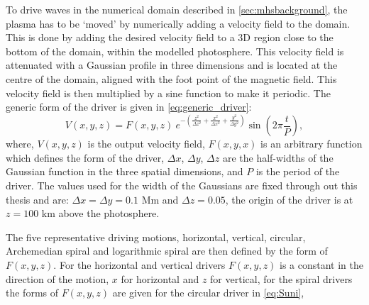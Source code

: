 \documentclass[a4paper,12pt,fourier,authoryear,custommargin]{Classes/PhDThesisPSnPDF}
\begin{document}
To drive waves in the numerical domain described in \cref{sec:mhsbackground}, the plasma has to be `moved' by numerically adding a velocity field to the domain.
This is done by adding the desired velocity field to a 3D region close to the bottom of the domain, within the modelled photosphere.
This velocity field is attenuated with a Gaussian profile in three dimensions and is located at the centre of the domain, aligned with the foot point of the magnetic field.
This velocity field is then multiplied by a sine function to make it periodic. The generic form of the driver is given in \cref{eq:generic_driver}:
\begin{equation}
	V(x,y,z) = F(x,y,z) \ e^{-\left(\frac{z^2}{\Delta z^2} + \frac{x^2}{\Delta x^2} + \frac{y^2}{\Delta y^2}\right)} \sin \left(2\pi \frac{t}{P}\right),
	\label{eq:generic_driver}
\end{equation}
where, $V(x,y,z)$ is the output velocity field, $F(x,y,x)$ is an arbitrary function which defines the form of the driver, $\Delta x$, $\Delta y$, $\Delta z$ are the half-widths of the Gaussian function in the three spatial dimensions, and $P$ is the period of the driver.
The values used for the width of the Gaussians are fixed through out this thesis and are: $\Delta x = \Delta y = 0.1$ Mm and $\Delta z = 0.05$, the origin of the driver is at $z = 100$ km above the photosphere.

The five representative driving motions, horizontal, vertical, circular, Archemedian spiral and logarithmic spiral are then defined by the form of $F(x,y,z)$. For the horizontal and vertical drivers $F(x,y,z)$ is a constant in the direction of the motion, $x$ for horizontal and $z$ for vertical, for the spiral drivers the forms of $F(x,y,z)$ are given for the circular driver in \cref{eq:Suni},
\end{document}
